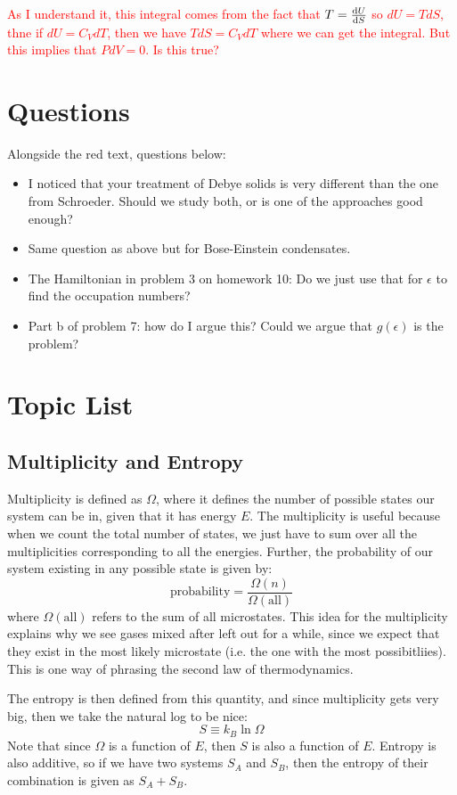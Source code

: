 \documentclass[10pt]{article}
\newcommand{\question}[1]{\textcolor{red}{#1}}
\begin{document}
	\question{As I understand it, this integral comes from the fact that \( T = \dv{U}{S} \) so \( dU = T dS \), thne 
		if \( dU = C_V dT \), then we have \( T dS = C_V dT \) where we can get the integral. But this implies that \( P dV = 0\). 
	Is this true?}
	\section{Questions}
	Alongside the red text, questions below:
	\begin{itemize}
		\item I noticed that your treatment of Debye solids is very different than the one from Schroeder. Should we study both, or 
			is one of the approaches good enough?
		\item Same question as above but for Bose-Einstein condensates. 
		\item The Hamiltonian in problem 3 on homework 10: Do we just use that for \( \epsilon \) to find the occupation 
			numbers?
		\item Part b of problem 7: how do I argue this? Could we argue that \( g(\epsilon) \) is the problem?  
	\end{itemize}
	\section{Topic List}
	\subsection{Multiplicity and Entropy}
	Multiplicity is defined as \( \Omega \), where it defines the number of possible states our system can be in, given that it 
	has energy \( E \). The multiplicity is useful because when we count the total number of states, we just have to sum over all 
	the multiplicities corresponding to all the energies. Further, the probability of our system existing in any possible state is 
	given by:
	\[
	\text{probability} = \frac{\Omega(n)}{\Omega(\text{all})}
	\] 
	where \( \Omega(\text{all}) \) refers to the sum of all microstates. This idea for the multiplicity explains why we see gases
	mixed after left out for a while, since we expect that they exist in the most likely microstate (i.e. the one with the most 
	possibitliies). This is one way of phrasing the second law of thermodynamics.  
	
	The entropy is then defined from this quantity, and since 
	multiplicity gets very big, then we take the natural log to be nice:
	\[
	S \equiv k_B \ln \Omega 
	\] 
	Note that since \( \Omega \) is a function of \( E \), then \( S \) is also a function of \( E \). Entropy is also additive, 
	so if we have two systems \( S_A \) and \( S_B \), then the entropy of their combination is given as \( S_A + S_B \). 
\end{document}
